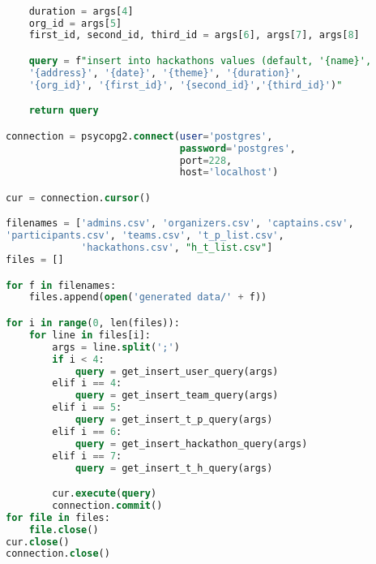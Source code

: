 \captionsetup{singlelinecheck=false, justification=raggedright}
\begin{lstlisting}[language=sql, caption=Заполнение базы данных, label=fill]

    duration = args[4]
    org_id = args[5]
    first_id, second_id, third_id = args[6], args[7], args[8]

    query = f"insert into hackathons values (default, '{name}', 
    '{address}', '{date}', '{theme}', '{duration}', 
    '{org_id}', '{first_id}', '{second_id}','{third_id}')"

    return query

connection = psycopg2.connect(user='postgres',
                              password='postgres',
                              port=228,
                              host='localhost')

cur = connection.cursor()

filenames = ['admins.csv', 'organizers.csv', 'captains.csv',
'participants.csv', 'teams.csv', 't_p_list.csv',
             'hackathons.csv', "h_t_list.csv"]
files = []

for f in filenames:
    files.append(open('generated data/' + f))

for i in range(0, len(files)):
    for line in files[i]:
        args = line.split(';')
        if i < 4:
            query = get_insert_user_query(args)
        elif i == 4:
            query = get_insert_team_query(args)
        elif i == 5:
            query = get_insert_t_p_query(args)
        elif i == 6:
            query = get_insert_hackathon_query(args)
        elif i == 7:
            query = get_insert_t_h_query(args)

        cur.execute(query)
        connection.commit()
for file in files:
    file.close()
cur.close()
connection.close()
\end{lstlisting}
